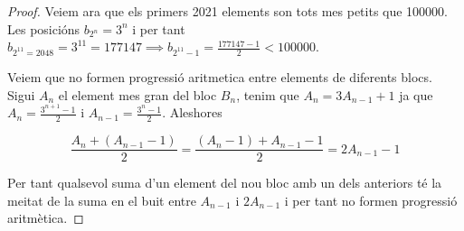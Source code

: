 \documentclass[12pt, a4papre]{article}
\begin{document}
\begin{proof}
	Veiem ara que els primers 2021 elements son tots mes petits que 100000. Les posicións $b_{2^n} = 3^n$ i per tant $b_{2^{11} = 2048} = 3^11 = 177147 \implies b_{2^{11}-1} = \frac{177147-1}{2} < 100000$.
	
	Veiem que no formen progressió aritmetica entre elements de diferents blocs. Sigui $A_n$ el element mes gran del bloc $B_n$, tenim que $A_n = 3A_{n-1}+1$ ja que $A_n = \frac{3^{n+1}-1}{2}$ i $A_{n-1} = \frac{3^{n}-1}{2}$. Aleshores 
	
	\[
		\frac{A_n+(A_{n-1}-1)}{2} = \frac{(A_n-1)+A_{n-1}-1}{2} = 2A_{n-1}-1
	\]
	
	Per tant qualsevol suma d'un element del nou bloc amb un dels anteriors té la meitat de la suma en el buit entre $A_{n-1}$ i $2A_{n-1}$ i per tant no formen progressió aritmètica.
	
	\end{proof}
	
\end{document}
